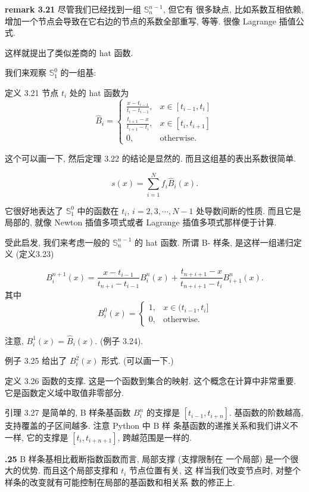 \documentclass[a4paper]{ctexart}
\newcommand{\remark}[1]
{\noindent {\bf Remark {#1}}}
\begin{document}
{\bf remark 3.21}
尽管我们已经找到一组 $\mathbb{S}_{n}^{n - 1}$, 但它有
很多缺点, 比如系数互相依赖, 增加一个节点会导致在它右边的节点的系数全部重写, 等等. 
很像 Lagrange 插值公式.

这样就提出了类似差商的 hat 函数. 

我们来观察 $\mathbb{S}_1^0$ 的一组基:

定义 3.21 节点 $t_i$ 处的 hat 函数为
$$
\hat{B}_i = \left\{
\begin{array}{ll}
  \frac{x - t_{i - 1}}{t_i - t_{i - 1}}, & x \in [t_{i - 1}, t_i] \\
  \frac{t_{i + 1} - x}{t_{i + 1} - t_i}, & x \in [t_i, t_{i + 1}] \\
  0, & \mbox{otherwise.}
\end{array}
\right.
$$

这个可以画一下, 然后定理 3.22 的结论是显然的. 而且这组基的表出系数很简单.

$$
s(x) = \sum_{i = 1}^N f_i \hat{B}_i(x).
$$

它很好地表达了 $\mathbb{S}_1^0$ 中的函数在 $t_i$, $i = 2, 3, \cdots, N - 1$
处导数间断的性质. 而且它是局部的, 就像 Newton 插值多项式或者 Lagrange 
插值多项式那样便于计算.

受此启发, 我们来考虑一般的 $\mathbb{S}_n^{n - 1}$ 的 hat 函数. 所谓 B-
样条, 是这样一组递归定义 (定义3.23)

$$
B_i^{n + 1}(x) = \frac{x - t_{i - 1}}{t_{n + i} - t_{i - 1}} B_i^{n}(x) 
+ \frac{t_{n + i + 1} - x}{t_{n + i + 1} - t_i} B_{i + 1}^n(x).
$$
其中
$$
B_i^0(x) = \left\{
\begin{array}{rcl}
  1, & x \in (t_{i - 1}, t_i] \\
  0, & \mbox{otherwise.}
\end{array}
\right. 
$$

注意, $B_i^1(x) = \hat{B}_i(x)$. (例子 3.24).

例子 3.25 给出了 $B_i^2(x)$ 形式. (可以画一下.)

定义 3.26 函数的支撑. 这是一个函数到集合的映射. 这个概念在计算中非常重要. 
它是函数定义域中取值非零部分.

引理 3.27 是简单的, B 样条基函数 $B_i^n$ 的支撑是 $[t_{i - 1}, t_{i +
    n}]$. 基函数的阶数越高, 支持覆盖的子区间越多. 注意 Python 中 B 样
条基函数的递推关系和我们讲义不一样, 它的支撑是 $[t_i, t_{i + n + 1}]$,
跨越范围是一样的.

{\bf \remark 3.25} B 样条基相比截断指数函数而言, 局部支撑 (支撑限制在
一个局部) 是一个很大的优势. 而且这个局部支撑和 $t_i$ 节点位置有关, 这
样当我们改变节点时, 对整个样条的改变就有可能控制在局部的基函数和相关系
数的修正上.
\end{document}
